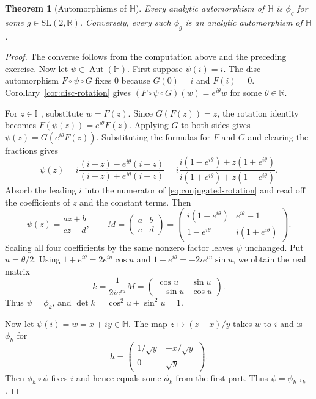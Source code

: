 \documentclass[11pt]{article}
\theoremstyle{plain}
\newtheorem{theorem}{Theorem}[section]
\theoremstyle{definition}
\theoremstyle{boldremark}
\theoremstyle{remark}
\numberwithin{equation}{section}
\newcommand{\R}{\mathbb{R}}
\begin{document}
\begin{theorem}[Automorphisms of $\mathbb H$]
Every analytic automorphism of $\mathbb H$ is $\phi_g$ for some
$g\in\mathrm{SL}(2,\R)$. Conversely, every such $\phi_g$ is an
analytic automorphism of $\mathbb H$.
\end{theorem}
\begin{proof}
The converse follows from the computation above and the preceding
exercise. Now let $\psi\in\operatorname{Aut}(\mathbb H)$. First
suppose $\psi(i)=i$. The disc automorphism $F\circ\psi\circ G$
fixes $0$ because $G(0)=i$ and $F(i)=0$. Corollary~\ref{cor:disc-rotation} gives
$(F\circ\psi\circ G)(w)=e^{i\theta}w$ for some $\theta\in\R$.

For $z\in\mathbb H$, substitute $w=F(z)$. Since $G(F(z))=z$, the rotation
identity becomes $F(\psi(z))=e^{i\theta}F(z)$. Applying $G$ to both sides
gives $\psi(z)=G(e^{i\theta}F(z))$.
Substituting the formulas for $F$ and $G$ and clearing the fractions gives
\begin{equation}\label{eq:conjugated-rotation}
 \psi(z)
   =i\frac{(i+z)-e^{i\theta}(i-z)}{(i+z)+e^{i\theta}(i-z)}
   =i\frac{i(1-e^{i\theta})+z(1+e^{i\theta})}
           {i(1+e^{i\theta})+z(1-e^{i\theta})}.
\end{equation}
Absorb the leading $i$ into the numerator of \eqref{eq:conjugated-rotation}
and read off the coefficients of $z$ and the constant terms. Then
\begin{equation}
 \psi(z)=\frac{az+b}{cz+d},
 \qquad
 M=\begin{pmatrix}a&b\\c&d\end{pmatrix}
   =\begin{pmatrix}
      i(1+e^{i\theta}) & e^{i\theta}-1\\
      1-e^{i\theta} & i(1+e^{i\theta})
    \end{pmatrix}.
\end{equation}
Scaling all four coefficients by the same nonzero factor leaves
$\psi$ unchanged. Put $u=\theta/2$. Using $1+e^{i\theta}=2e^{iu}\cos u$
and $1-e^{i\theta}=-2ie^{iu}\sin u$, we obtain the real matrix
\begin{equation}
 k=\frac{1}{2ie^{iu}}M
   =\begin{pmatrix}\cos u&\sin u\\-\sin u&\cos u\end{pmatrix}.
\end{equation}
Thus $\psi=\phi_k$, and $\det k=\cos^2 u+\sin^2 u=1$.

Now let $\psi(i)=w=x+iy\in\mathbb H$. The map $z\mapsto(z-x)/y$
takes $w$ to $i$ and is $\phi_h$ for
\begin{equation}
 h=\begin{pmatrix}1/\sqrt y&-x/\sqrt y\\0&\sqrt y\end{pmatrix}.
\end{equation}
Then $\phi_h\circ\psi$ fixes $i$ and hence equals some $\phi_k$
from the first part. Thus $\psi=\phi_{h^{-1}k}$.
\end{proof}
\end{document}
